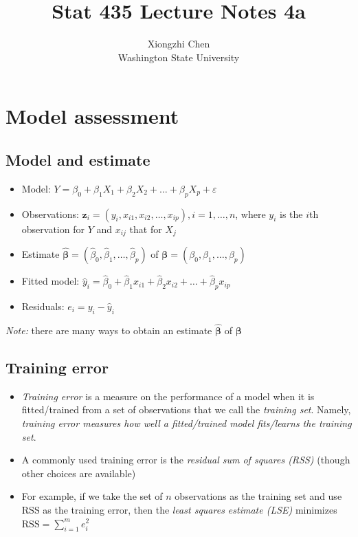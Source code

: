 \documentclass[]{article}
\title{Stat 435 Lecture Notes 4a}
\author{Xiongzhi Chen \\ Washington State University}
\date{}
\providecommand{\tightlist}{%
  \setlength{\itemsep}{0pt}\setlength{\parskip}{0pt}}
\begin{document}
\maketitle

{
\setcounter{tocdepth}{2}
\tableofcontents
}
\section{}\label{section}

\section{Model assessment}\label{model-assessment}

\subsection{Model and estimate}\label{model-and-estimate}

\begin{itemize}
\tightlist
\item
  Model:
  \(Y=\beta_0+\beta_1 X_1 + \beta_2 X_2 + \ldots + \beta_p X_p + \varepsilon\)
\item
  Observations:
  \(\mathbf{z}_i=(y_i,x_{i1},x_{i2},\ldots,x_{ip}),i=1,\ldots,n\), where
  \(y_i\) is the \(i\)th observation for \(Y\) and \(x_{ij}\) that for
  \(X_j\)
\item
  Estimate
  \(\hat{\boldsymbol{\beta}}=(\hat{\beta}_0,\hat{\beta}_1,\ldots,\hat{\beta}_p)\)
  of \({\boldsymbol{\beta}}=({\beta}_0,{\beta}_1,\ldots,{\beta}_p)\)
\item
  Fitted model:
  \(\hat{y}_i=\hat{\beta}_0+\hat{\beta}_1 x_{i1} + \hat{\beta}_2 x_{i2} + \ldots + \hat{\beta}_p x_{ip}\)
\item
  Residuals: \(e_i=y_i - \hat{y}_i\)
\end{itemize}

\emph{Note:} there are many ways to obtain an estimate
\(\hat{\boldsymbol{\beta}}\) of \({\boldsymbol{\beta}}\)

\subsection{Training error}\label{training-error}

\begin{itemize}
\item
  \emph{Training error} is a measure on the performance of a model when
  it is fitted/trained from a set of observations that we call the
  \emph{training set}. Namely, \emph{training error measures how well a
  fitted/trained model fits/learns the training set}.
\item
  A commonly used training error is the \emph{residual sum of squares
  (RSS)} (though other choices are available)
\item
  For example, if we take the set of \(n\) observations as the training
  set and use RSS as the training error, then the \emph{least squares
  estimate (LSE)} minimizes \(\textrm{RSS}=\sum_{i=1}^m e_i^2\)
\end{itemize}
\end{document}
